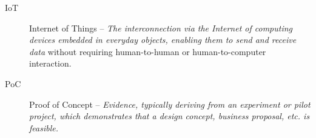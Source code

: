 \begin{description}
	\item[IoT] Internet of Things -- \textit{The interconnection via the Internet of computing devices embedded in everyday objects, enabling them to send and receive data} \cite{IoT-dictionary} without requiring human-to-human or human-to-computer interaction. \cite{IoT-definition-no-interaction}
	\item[PoC] Proof of Concept -- \textit{Evidence, typically deriving from an experiment or pilot project, which demonstrates that a design concept, business proposal, etc. is feasible.} \cite{PoC-dictionary}
\end{description}
